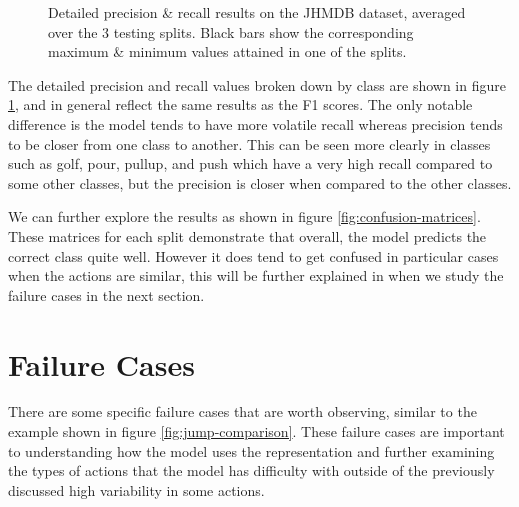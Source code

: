 \begin{figure}[H]
	\centering
	\caption{Detailed precision \& recall results on the JHMDB dataset, averaged over the 3 testing splits. Black bars show the corresponding maximum \& minimum values attained in one of the splits.}
	\label{fig:detailed-recall-precision}
\end{figure}

The detailed precision and recall values broken down by class are shown in figure \ref{fig:detailed-recall-precision}, and in general reflect the same results as the F1 scores. The only notable difference is the model tends to have more volatile recall whereas precision tends to be closer from one class to another. This can be seen more clearly in classes such as golf, pour, pullup, and push which have a very high recall compared to some other classes, but the precision is closer when compared to the other classes.


We can further explore the results as shown in figure \ref{fig:confusion-matrices}. These matrices for each split demonstrate that overall, the model predicts the correct class quite well. However it does tend to get confused in particular cases when the actions are similar, this will be further explained in when we study the failure cases in the next section.

\section{Failure Cases}
\label{sec:failure-cases}

There are some specific failure cases that are worth observing, similar to the example shown in figure \ref{fig:jump-comparison}. These failure cases are important to understanding how the model uses the representation and further examining the types of actions that the model has difficulty with outside of the previously discussed high variability in some actions.

